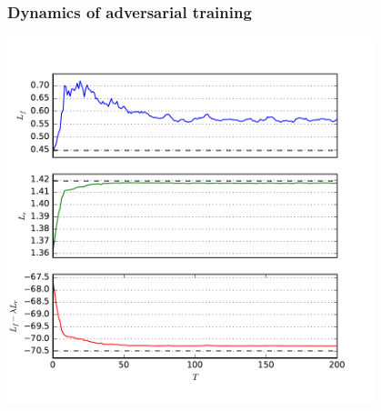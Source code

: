 \documentclass{beamer}
\begin{document}
\begin{frame}
    \frametitle{Dynamics of adversarial training}

    \begin{center}
        \includegraphics[width=0.8\textwidth]{figures/training.pdf}
    \end{center}
\end{frame}


\end{document}
